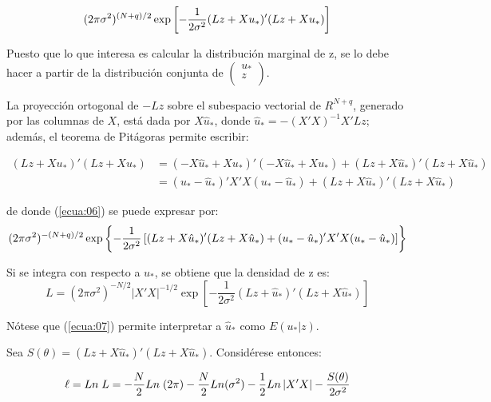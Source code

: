 \begin{equation}{
\label{ecua:06}
(2\pi \sigma^{2})^{(N+q)/2}\exp \left[-\frac{1}{2\sigma^{2}}(Lz+Xu_{\ast})' (Lz+Xu_{\ast }) \right] }
\end{equation}

Puesto que lo que interesa es calcular la distribuci\'{o}n marginal de z, se lo debe hacer a partir de la distribuci\'{o}n conjunta de $\left( {\begin{array}{l}
 u_{\ast } \\ 
 z \\ 
 \end{array}} \right)$.\newline

La proyecci\'{o}n ortogonal de $-Lz$ sobre el subespacio vectorial de $R^{N+q}$, generado por las columnas de $X$, est\'{a} dada por $X\hat{u}_{\ast}$, donde $\hat{u}_{\ast}=-(X'X)^{-1}X'Lz$; adem\'{a}s, el teorema de Pit\'{a}goras permite escribir:

\begin{align*}
(Lz+Xu_{\ast})'(Lz+Xu_{\ast} ) &= (-X\hat{u}_{\ast} + Xu_{\ast} )'(-X\hat{u}_{\ast} +Xu_{\ast}) + (Lz+X\hat{u}_{\ast})'(Lz+X\hat{u}_{\ast})\\
                               &= (u_{\ast} -\hat{u}_{\ast})'X'X(u_{\ast} - \hat{u}_{\ast}) + (Lz+X\hat{u}_{\ast})'(Lz+X\hat{u}_{\ast})
\end{align*}

de donde (\ref{ecua:06}) se puede expresar por:
\begin{equation}{
\label{ecua:07}
(2\pi \sigma^{2})^{-(N+q)/2}\exp \left\{-\frac{1}{2\sigma^{2}}\left[{(Lz+X\hat{u}_{\ast} )'(Lz+X\hat{u}_{\ast})+(u_{\ast} -\hat{u}_{\ast})'X'X(u_{\ast} -\hat{u}_{\ast})} \right]\right\} }
\end{equation}

Si se integra con respecto a $u_{\ast } $, se obtiene que la densidad de z es:
\[
L=(2\pi \sigma^{2})^{-N/2}\left| {X'X} \right|^{-1/2}\exp \left[-\frac{1}{2\sigma^{2}}(Lz+\hat{u}_{\ast})'(Lz+X\hat{u}_{\ast}) \right]
\]

N\'{o}tese que (\ref{ecua:07}) permite interpretar a $\hat{u}_{\ast}$ como $E(u_{\ast}| z)$.\newline

Sea $S(\theta)= (Lz+X\hat{u}_{\ast})'(Lz+X\hat{u}_{\ast})$. Consid\'{e}rese entonces:

\begin{equation}{
\label{ecua:08}
\ell =Ln\;L=-\frac{N}{2}Ln\;(2\pi )-\frac{N}{2}Ln(\sigma^{2})-\frac{1}{2}Ln\left| {X'X} \right|-\frac{S(\theta)}{2\sigma^{2}} }
\end{equation}

